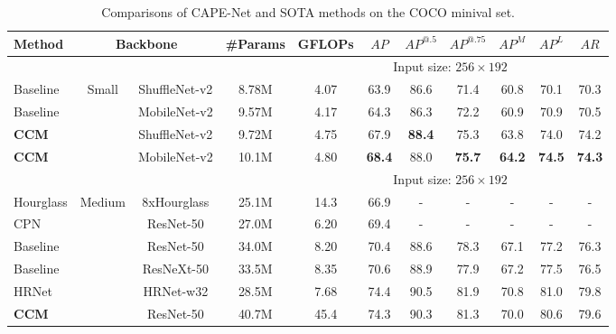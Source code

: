\documentclass[twocolumn]{svjour3}          \smartqed  \usepackage{natbib}
\begin{document}
\begin{table*}[htbp]
\centering
  \caption{Comparisons of CAPE-Net and SOTA methods on the COCO minival set.}
    \begin{tabular}{llccccccccc}
\toprule
      Method    & \multicolumn{2}{c}{Backbone} & \#Params & GFLOPs &$AP$    & $AP^{@.5}$  & $AP^{@.75}$  & $AP^M$   & $AP^L$   & $AR$ \\
    \midrule
     & &  & & \multicolumn{7}{c}{Input size: $256\times192$} \\
    Baseline \citep{xiao2018simple} & \multicolumn{1}{c}{\multirow{4}[0]{*}{Small}} & ShuffleNet-v2 & 8.78M & 4.07 & 63.9    &  86.6     &  71.4     &  60.8     &  70.1     & 70.3 \\
    Baseline \citep{xiao2018simple} & \multicolumn{1}{c}{} & MobileNet-v2 & 9.57M & 4.17 & 64.3     &  86.3     &  72.2     &  60.9     &  70.9     & 70.5 \\
    \textbf{CCM} & \multicolumn{1}{c}{} & ShuffleNet-v2 & 9.72M & 4.75 & {67.9}     &  \textbf{88.4}     &  {75.3}     &  {63.8}     &  {74.0}    & {74.2}\\
    \textbf{CCM} & \multicolumn{1}{c}{} & MobileNet-v2 & 10.1M & 4.80 & \textbf{68.4}     &  {88.0}     &  \textbf{75.7}     &  \textbf{64.2}     &  \textbf{74.5}    & \textbf{74.3} \\
    \midrule
    \midrule
    & &  & & \multicolumn{7}{c}{Input size: $256\times192$} \\
    Hourglass \citep{newell2016stacked} & \multicolumn{1}{c}{\multirow{8}[0]{*}{Medium}} & 8xHourglass & 25.1M & 14.3 &  66.9     &   -    &    -   &    -   &    -   & - \\
    CPN \citep{chen2018cascaded} & \multicolumn{1}{c}{}  & ResNet-50 & 27.0M & 6.20 & 69.4     &  -     &   -    &   -    &   -    & - \\
    Baseline \citep{xiao2018simple} & \multicolumn{1}{c}{}  & ResNet-50 & 34.0M & 8.20 & 70.4     &  88.6     &  78.3     &  67.1     &  77.2     & 76.3 \\
    Baseline \citep{xiao2018simple} & \multicolumn{1}{c}{}  & ResNeXt-50 & 33.5M & 8.35 & 70.6     &  88.9     &  77.9    &  67.2     &  77.5     & 76.5 \\
    HRNet \citep{sun2019deep} & \multicolumn{1}{c}{}  & HRNet-w32 & 28.5M & 7.68 & 74.4     &  90.5     &  81.9     &  70.8     &  81.0    & 79.8 \\
    \textbf{CCM} & \multicolumn{1}{c}{}  & ResNet-50 & 40.7M & 45.4 & 74.3         & 90.3         & 81.3         &  70.0        &  80.6       & 79.6  \\

\end{tabular}
\end{table*}
\end{document}
